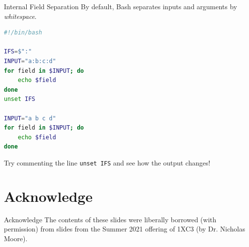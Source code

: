 \documentclass[11pt]{beamer}
\begin{document}
\begin{frame}[fragile=singleslide]{Internal Field Separation}
By default, Bash separates inputs and arguments by \emph{whitespace}.
\begin{lstlisting}[style=terminal, language=bash]
#!/bin/bash

IFS=$":"
INPUT="a:b:c:d"
for field in $INPUT; do
    echo $field
done
unset IFS

INPUT="a b c d"
for field in $INPUT; do
    echo $field
done
\end{lstlisting}

Try commenting the line \texttt{unset IFS} and see how the output changes! 
\end{frame}


\section[Acknowledge]{Acknowledge}
\begin{frame}{Acknowledge}
\center
\vspace{8em}
The contents of these slides were liberally borrowed (with permission) from slides from the Summer 2021 offering of 1XC3 (by Dr. Nicholas Moore).  
\end{frame}
\end{document}
